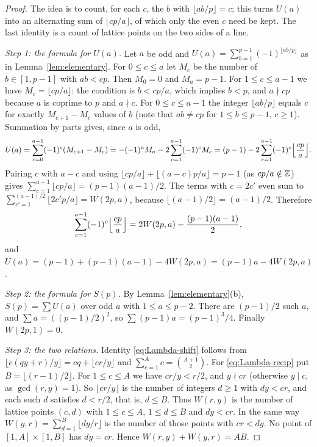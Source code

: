 \begin{proof}
The idea is to count, for each $c$, the $b$ with $\lfloor ab/p\rfloor=c$; this turns $U(a)$ into an alternating sum of $\lfloor cp/a\rfloor$, of which only the even $c$ need be kept. The last identity is a count of lattice points on the two sides of a line.

\emph{Step 1: the formula for $U(a)$.} Let $a$ be odd and $U(a)=\sum_{b=1}^{p-1}(-1)^{\lfloor ab/p\rfloor}$ as in Lemma~\ref{lem:elementary}. For $0\le c\le a$ let $M_c$ be the number of $b\in[1,p-1]$ with $ab<cp$. Then $M_0=0$ and $M_a=p-1$. For $1\le c\le a-1$ we have $M_c=\lfloor cp/a\rfloor$: the condition is $b<cp/a$, which implies $b<p$, and $a\nmid cp$ because $a$ is coprime to $p$ and $a\nmid c$. For $0\le c\le a-1$ the integer $\lfloor ab/p\rfloor$ equals $c$ for exactly $M_{c+1}-M_c$ values of $b$ (note that $ab\ne cp$ for $1\le b\le p-1$, $c\ge1$). Summation by parts gives, since $a$ is odd,
\[
U(a)=\sum_{c=0}^{a-1}(-1)^c(M_{c+1}-M_c)=-(-1)^aM_a-2\sum_{c=1}^{a-1}(-1)^cM_c=(p-1)-2\sum_{c=1}^{a-1}(-1)^c\Bigl\lfloor\frac{cp}a\Bigr\rfloor .
\]
Pairing $c$ with $a-c$ and using $\lfloor cp/a\rfloor+\lfloor(a-c)p/a\rfloor=p-1$ (as $cp/a\notin\mathbb{Z}$) gives $\sum_{c=1}^{a-1}\lfloor cp/a\rfloor=(p-1)(a-1)/2$. The terms with $c=2c'$ even sum to $\sum_{c'=1}^{(a-1)/2}\lfloor 2c'p/a\rfloor=W(2p,a)$, because $\lfloor(a-1)/2\rfloor=(a-1)/2$. Therefore
\[
\sum_{c=1}^{a-1}(-1)^c\Bigl\lfloor\frac{cp}a\Bigr\rfloor=2W(2p,a)-\frac{(p-1)(a-1)}2,
\]
and $U(a)=(p-1)+(p-1)(a-1)-4W(2p,a)=(p-1)a-4W(2p,a)$.

\emph{Step 2: the formula for $S(p)$.} By Lemma~\ref{lem:elementary}(b), $S(p)=\sum U(a)$ over odd $a$ with $1\le a\le p-2$. There are $(p-1)/2$ such $a$, and $\sum a=((p-1)/2)^2$, so $\sum(p-1)a=(p-1)^3/4$. Finally $W(2p,1)=0$.

\emph{Step 3: the two relations.} Identity \eqref{eq:Lambda-shift} follows from $\lfloor c(qy+r)/y\rfloor=cq+\lfloor cr/y\rfloor$ and $\sum_{c=1}^Ac=\binom{A+1}2$. For \eqref{eq:Lambda-recip} put $B=\lfloor(r-1)/2\rfloor$. For $1\le c\le A$ we have $cr/y<r/2$, and $y\nmid cr$ (otherwise $y\mid c$, as $\gcd(r,y)=1$). So $\lfloor cr/y\rfloor$ is the number of integers $d\ge1$ with $dy<cr$, and each such $d$ satisfies $d<r/2$, that is, $d\le B$. Thus $W(r,y)$ is the number of lattice points $(c,d)$ with $1\le c\le A$, $1\le d\le B$ and $dy<cr$. In the same way $W(y,r)=\sum_{d=1}^B\lfloor dy/r\rfloor$ is the number of those points with $cr<dy$. No point of $[1,A]\times[1,B]$ has $dy=cr$. Hence $W(r,y)+W(y,r)=AB$.
\end{proof}

